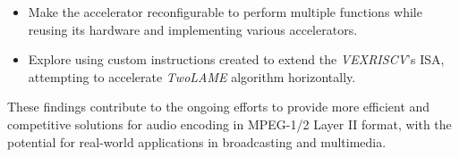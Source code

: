 \begin{itemize} 

\item Make the accelerator reconfigurable to perform multiple functions while reusing its hardware and implementing various accelerators.

\item Explore using custom instructions created to extend the  \textit{VEXRISCV}’s ISA, attempting to accelerate \textit{TwoLAME} algorithm horizontally. 

\end{itemize} 

These findings contribute to the ongoing efforts to provide more efficient and competitive solutions for audio encoding in MPEG-1/2 Layer II format, with the potential for real-world applications in broadcasting and multimedia.



